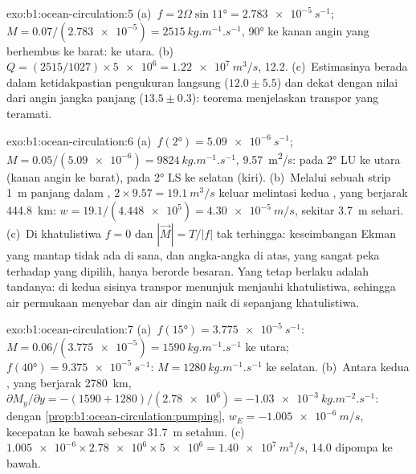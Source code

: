 \begin{solution}{exo:b1:ocean-circulation:5}
(a)~$f = 2\Omega\sin\ang{11} = \qty{2.783e-5}{s^{-1}}$; $M = 0.07/(\num{2.783e-5}) =
\qty{2515}{kg.m^{-1}.s^{-1}}$, \ang{90} ke kanan angin yang berhembus ke barat:
ke utara. (b)~$Q = (2515/1027) \times \num{5e6} = \qty{1.22e7}{m^3/s}$,
\qty{12.2}{\sverdrup}. (c)~Estimasinya berada dalam ketidakpastian pengukuran langsung ($12.0 \pm 5.5$) dan dekat dengan nilai dari angin jangka panjang
($13.5 \pm 0.3$): teorema menjelaskan transpor yang teramati.
\end{solution}

\begin{solution}{exo:b1:ocean-circulation:6}
(a)~$f(\ang{2}) = \qty{5.09e-6}{s^{-1}}$; $M = 0.05/(\num{5.09e-6}) =
\qty{9824}{kg.m^{-1}.s^{-1}}$, \qty{9.57}{m^2/s}: pada \ang{2} LU ke utara (kanan angin ke barat),
pada \ang{2} LS ke selatan (kiri). (b)~Melalui sebuah strip \qty{1}{m} panjang dalam , $2 \times 9.57 = \qty{19.1}{m^3/s}$ keluar melintasi kedua , yang berjarak \qty{444.8}{km}: $w = 19.1/(\num{4.448e5}) = \qty{4.30e-5}{m/s}$,
sekitar \qty{3.7}{m} sehari. (c)~Di khatulistiwa $f = 0$ dan $|\vec M| = T/|f|$ tak terhingga: keseimbangan Ekman yang mantap tidak ada di sana, dan angka-angka di atas, yang sangat peka terhadap  yang dipilih, hanya berorde besaran. Yang tetap berlaku adalah tandanya: di kedua sisinya transpor menunjuk menjauhi khatulistiwa, sehingga air permukaan menyebar dan air dingin naik di sepanjang khatulistiwa.
\end{solution}

\begin{solution}{exo:b1:ocean-circulation:7}
(a)~$f(\ang{15}) = \qty{3.775e-5}{s^{-1}}$: $M = 0.06/(\num{3.775e-5}) =
\qty{1590}{kg.m^{-1}.s^{-1}}$ ke utara; $f(\ang{40}) =
\qty{9.375e-5}{s^{-1}}$: $M = \qty{1280}{kg.m^{-1}.s^{-1}}$ ke selatan.
(b)~Antara kedua , yang berjarak \qty{2780}{km}, $\partial M_y/\partial y =
-(1590 + 1280)/(\num{2.78e6}) = \qty{-1.03e-3}{kg.m^{-2}.s^{-1}}$: dengan
\cref{prop:b1:ocean-circulation:pumping}, $w_E = \qty{-1.005e-6}{m/s}$, kecepatan ke bawah
sebesar \qty{31.7}{m} setahun. (c)~$\num{1.005e-6} \times \num{2.78e6} \times
\num{5e6} = \qty{1.40e7}{m^3/s}$, \qty{14.0}{\sverdrup} dipompa ke bawah.
\end{solution}

